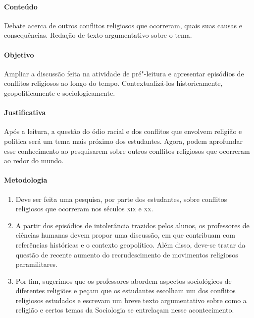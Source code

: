 \documentclass[12pt]{extarticle}
\begin{document}
\paragraph{Conteúdo} Debate acerca de outros conflitos religiosos
que ocorreram, quais suas causas e consequências. Redação de texto
argumentativo sobre o tema.

\paragraph{Objetivo} Ampliar a discussão feita na atividade de pré"-leitura
e apresentar episódios de conflitos religiosos ao longo do tempo.
Contextualizá-los historicamente, geopoliticamente e sociologicamente.

\paragraph{Justificativa} Após a leitura, a questão do ódio racial e dos
conflitos que envolvem religião e política será um tema mais próximo dos estudantes.
Agora, podem aprofundar esse conhecimento ao pesquisarem sobre outros conflitos 
religiosos que ocorreram ao redor do mundo.

\paragraph{Metodologia}

\begin{enumerate}

\item Deve ser feita uma pesquisa, por parte dos estudantes, sobre
conflitos religiosos que ocorreram nos séculos \textsc{xix} e \textsc{xx}. 

\item A partir dos episódios de intolerância trazidos pelos 
alunos, os professores de ciências humanas devem propor uma discussão,
em que contribuam com referências históricas e o contexto geopolítico.
Além disso, deve-se tratar da questão de recente aumento do
recrudescimento de movimentos religiosos
paramilitares. 

\item Por fim, sugerimos que os professores abordem
aspectos sociológicos de diferentes
religiões e peçam que os estudantes escolham um 
dos conflitos religiosos estudados e escrevam um
breve texto argumentativo sobre como a religião
e certos temas da Sociologia se entrelaçam nesse acontecimento.

\end{enumerate}
\end{document}
